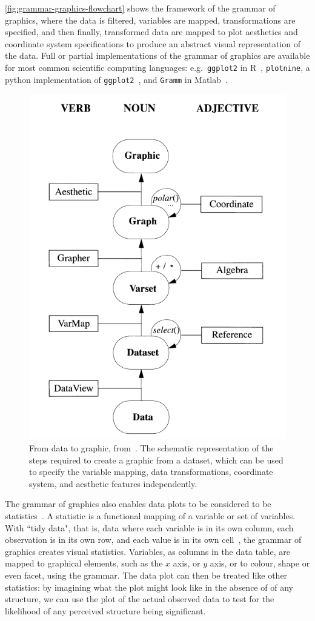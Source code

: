 \documentclass[letterpaper]{ar-1col}\usepackage[]{graphicx}\usepackage[]{color}
\begin{document}
\autoref{fig:grammar-graphics-flowchart} shows the framework of the grammar of graphics, where the data is filtered, variables are mapped, transformations are specified, and then finally, transformed data are mapped to plot aesthetics and coordinate system specifications to produce an abstract visual representation of the data. Full or partial implementations of the grammar of graphics are available for most common scientific computing languages: e.g.\ \texttt{ggplot2} in R~\citep{wickhamLayeredGrammarGraphics2010}, \texttt{plotnine}, a python implementation of \texttt{ggplot2}~\citep{plotnine2017}, and \texttt{Gramm} in Matlab~\citep{morelGrammGrammarGraphics2018}.

\begin{figure}
\centering
\includegraphics[width=.5\textwidth]{figure/grammar-graphics-flowchart}
\caption{From data to graphic, from~\citep[Fig 2.1]{wilkinson1999grammar}. The schematic representation of the steps required to create a graphic from a dataset, which can be used to specify the variable mapping, data transformations, coordinate system, and aesthetic features independently.}\label{fig:grammar-graphics-flowchart}
\end{figure}

The grammar of graphics also enables data plots to be considered to be statistics~\citep{majumderValidationVisualStatistical2013}. A statistic is a functional mapping of a variable or set of variables. With ``tidy data", that is, data where each variable is in its own column, each observation is in its own row, and each value is in its own cell~\citep{Wickham:2017:RDS:3086927}, the grammar of graphics creates visual statistics. Variables, as columns in the data table, are mapped to graphical elements, such as the $x$ axis, or $y$ axis, or to colour, shape or even facet, using the grammar. The data plot can then be treated like other statistics: by imagining what the plot might look like in the absence of of any structure, we can use the plot of the actual observed data to test for the likelihood of any perceived structure being significant.
\end{document}
